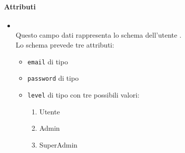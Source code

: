 \paragraph*{Attributi}
\begin{itemize}
\item[]  \\ Questo campo dati rappresenta lo schema  dell'utente . \\
Lo schema prevede tre attributi:
\begin{itemize}
\item[]  \texttt{email} di tipo 
\item[]  \texttt{password} di tipo 
\item[]  \texttt{level} di tipo  con tre possibili valori: 
\begin{enumerate}
\item Utente
\item Admin
\item SuperAdmin
\end{enumerate}
\end{itemize}

\end{itemize}

